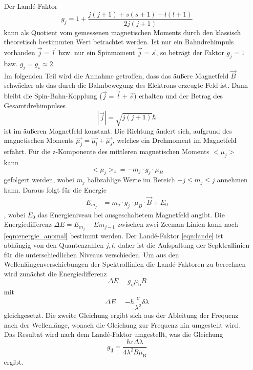 Der Landé-Faktor
\begin{equation}
    g_j = 1 + \frac{j(j+1) + s(s+1) - l(l+1)}{2j(j+1)}
    \label{eqn:lande}
\end{equation}
kann als Quotient vom gemessenen magnetischen Moments durch den klassisch theoretisch bestimmten Wert betrachtet werden.
Ist nur ein Bahndrehimpuls vorhanden $\vec{j}=\vec{l}$ bzw. nur ein Spinmoment $\vec{j}=\vec{s}$, so beträgt der Faktor $g_j=1$ bzw. $g_j = g_s \approx 2$.
\\
Im folgenden Teil wird die Annahme getroffen, dass das äußere Magnetfeld $\vec{B}$ schwächer als das durch die Bahnbewegung des Elektrons erzeugte Feld ist.
Dann bleibt die Spin-Bahn-Kopplung ($\vec{j}=\vec{l}+\vec{s}$) erhalten und der Betrag des Gesamtdrehimpulses
\begin{equation*}
    |\vec{j}| = \sqrt{j(j+1)} \hbar
\end{equation*}
ist im äußeren Magnetfeld konstant.
Die Richtung ändert sich, aufgrund des magnetischen Moments $\vec{\mu_j} = \vec{\mu_l} + \vec{\mu_s}$, welches ein Drehmoment im Magnetfeld erfährt.
Für die z-Komponente des mittleren magnetischen Moments $<\mu_j>$ kann
\begin{equation*}
    <\mu_j>_z = - m_j \cdot g_j \cdot \mu_B
\end{equation*}
gefolgert werden, wobei $m_j$ halbzahlige Werte im Bereich $-j \leq m_j \leq j$ annehmen kann.
Daraus folgt für die Energie
\begin{align}
    E_{m_j} &= m_j \cdot g_j \cdot \mu_B \cdot \vec{B} + E_0
    \label{eqn:energie_anomal}
\end{align}
, wobei $E_0$ das Energieniveau bei ausgeschaltetem Magnetfeld angibt.
Die Energiedifferenz $\Delta E = E_{m_j} - E{m_{j-1}}$ zwischen zwei Zeeman-Linien kann nach \autoref{eqn:energie_anomal} bestimmt werden.
Der Landé-Faktor \eqref{eqn:lande} ist abhängig von den Quantenzahlen $j,l$, daher ist die Aufspaltung der Sepktrallinien für die unterschiedlichen Niveaus verschieden.
Um aus den Wellenlängenverschiebungen der Spektrallinien die Landé-Faktoren zu berechnen wird zunächst die Energiedifferenz
\begin{equation*}
    \Delta E = g _\text{ij} \mu _\text{b} B
\end{equation*}
mit 
\begin{equation*}
    \Delta E = -h \frac{c}{\lambda^2} \delta \lambda
\end{equation*}
gleichgesetzt.
Die zweite Gleichung ergibt sich aus der Ableitung der Frequenz nach der Wellenlänge, wonach die Gleichung zur Frequenz hin umgestellt wird.
Das Resultat wird nach dem Landé-Faktor umgestellt, was die Gleichung 
\begin{equation}
    g_\text{ij} = \frac{hc \Delta \lambda}{4 \lambda^2 B \mu_\text{B}}
    \label{eq:Lande_Faktor}
\end{equation}
ergibt.
\FloatBarrier

